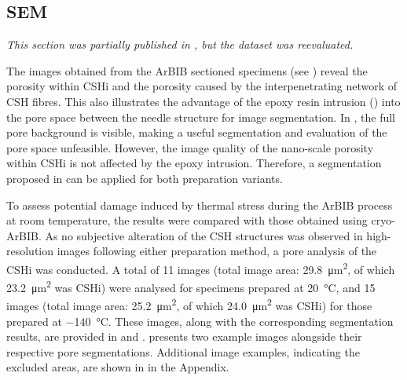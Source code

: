 \subsection{\acs*{SEM}}
\label{subsec:pores_C3S_SEM}

\textit{This section was partially published in \cite{kleiner.2021a}, but the dataset was reevaluated.}

The images obtained from the \ac{ArBIB} sectioned specimens (see ) reveal the porosity within \ac{CSHi} and the porosity caused by the interpenetrating network of \ac{CSH} fibres.
This also illustrates the advantage of the epoxy resin intrusion () into the pore space between the needle structure for image segmentation.
In , the full pore background is visible, making a useful segmentation and evaluation of the pore space unfeasible.
However, the image quality of the nano-scale porosity within \ac{CSHi} is not affected by the epoxy intrusion.
Therefore, a segmentation proposed in  can be applied for both preparation variants.

To assess potential damage induced by thermal stress during the \ac{ArBIB} process at room temperature, the results were compared with those obtained using cryo-\ac{ArBIB}.
As no subjective alteration of the \ac{CSH} structures was observed in high-resolution images following either preparation method, a pore analysis of the \ac{CSHi} was conducted.
A total of \num{11} images (total image area: \qty{29.8}{\micro\meter\squared}, of which \qty{23.2}{\micro\meter\squared} was \ac{CSHi}) were analysed for specimens prepared at \qty{20}{\celsius}, and \num{15} images (total image area: \qty{25.2}{\micro\meter\squared}, of which \qty{24.0}{\micro\meter\squared} was \ac{CSHi}) for those prepared at \qty{-140}{\celsius}.
These images, along with the corresponding segmentation results, are provided in  and \cite{kleiner.2021g,kleiner.2021h}.
 presents two example images alongside their respective pore segmentations.
Additional image examples, indicating the excluded areas, are shown in  in the Appendix.

